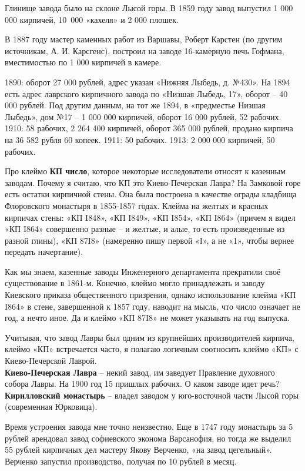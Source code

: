Глинище завода было на склоне Лысой горы. 
В 1859 году завод выпустил 1 000 000 кирпичей, \mbox{10 000} «кахеля» и 2 000 плошек.

В 1887 году мастер каменных работ из Варшавы,  Роберт Карстен (по другим источникам, А. И. Карсгенс), построил на заводе 16-камерную печь Гофмана, вместимостью по 1 000 кирпичей в камере.

1890: оборот 27 000 рублей, адрес указан «Нижняя Лыбедь, д. №430». На 1894 есть адрес лаврского кирпичного завода по «Низшая Лыбедь, 17», оборот – 40 000 рублей. Под другим данным, на тот же 1894, в «предместье Низшая Лыбедь», дом №17 – 1 000 000 кирпичей, оборот 16 000 рублей, 52 рабочих. 1910: 58 рабочих, 2 264 400 кирпичей, оборот 365 000 рублей, продано кирпича на 36 582 рубля 60 копеек. 1911: 50 рабочих. 1913: 2 000 000 кирпичей, 50 рабочих.

Про клеймо \textbf{КП число}, которое некоторые исследователи относят к казенным заводам. Почему я считаю, что КП это Киево-Печерская Лавра? На Замковой горе есть остатки кирпичной стены. Она была построена в качестве ограды кладбища Флоровского монастыря в 1855-1857 годах. Клейма на желтых и красных кирпичах стены: «КП I848», «КП I849», «КП I854», «КП I864» (причем я видел «КП I864» совершенно разные – и желтые, и алые, то есть произведенные из разной глины), «КП 87I8» (намеренно пишу первой «I», а не «1», чтобы вернее передать начертание). 

Как мы знаем, казенные заводы Инженерного департамента прекратили своё существование в 1861-м. Конечно, клеймо могло принадлежать и заводу Киевского приказа общественного призрения, однако использование клейма «КП I864» в стене, завершенной к 1857 году, наводит на мысль, что число означает не год, а нечто иное. Да и клеймо «КП 87I8» не может указывать на год выпуска.

Учитывая, что завод Лавры был одним из крупнейших производителей кирпича, клеймо «КП» встречается часто, я полагаю логичным соотносить клеймо «КП» с Киево-Печерской Лаврой.\\ 

\noindent\textbf{Киево-Печерская Лавра} – некий завод, им заведует Правление духовного собора Лавры. На 1900 год 15 пришлых рабочих. О каком заводе идет речь?\\

\noindent\textbf{Кирилловский монастырь} – владел заводом у юго-восточной части Лысой горы (современная Юрковица).

Время устроения завода мне точно неизвестно. Еще в 1747 году монастырь за 5 рублей арендовал завод софиевского эконома Варсанофия, но тогда же выделил 55 рублей кирпичных дел мастеру Якову Верченко, «на завод цегельный». Верченко запустил производство, получая по 10 рублей в месяц. 


